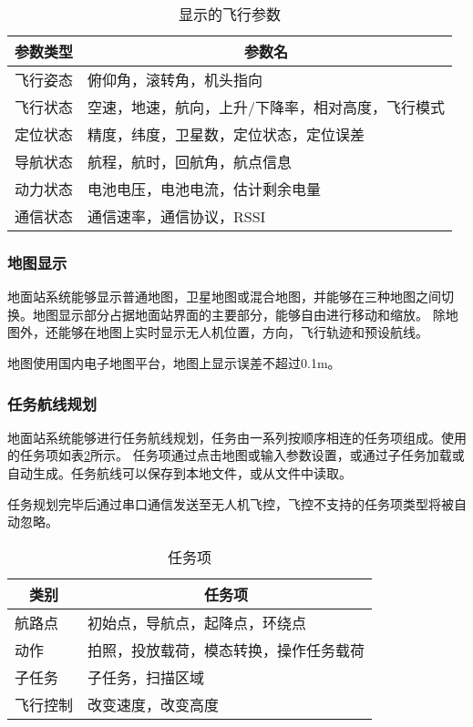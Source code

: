 \begin{table}[ht]
\centering
\caption{显示的飞行参数}
\label{t3dppara}
\begin{tabular}{|l|l|}
\hline
\multicolumn{1}{|c|}{参数类型} & \multicolumn{1}{c|}{参数名}  \\ \hline
飞行姿态 & 俯仰角，滚转角，机头指向              \\ \hline
飞行状态 & 空速，地速，航向，上升/下降率，相对高度，飞行模式 \\ \hline
定位状态 & 精度，纬度，卫星数，定位状态，定位误差       \\ \hline
导航状态 & 航程，航时，回航角，航点信息            \\ \hline
动力状态 & 电池电压，电池电流，估计剩余电量          \\ \hline
通信状态 & 通信速率，通信协议，RSSI            \\ \hline
\end{tabular}
\end{table}

\subsubsection{地图显示}
地面站系统能够显示普通地图，卫星地图或混合地图，并能够在三种地图之间切换。地图显示部分占据地面站界面的主要部分，能够自由进行移动和缩放。
除地图外，还能够在地图上实时显示无人机位置，方向，飞行轨迹和预设航线。

地图使用国内电子地图平台，地图上显示误差不超过0.1m。

\subsubsection{任务航线规划}
地面站系统能够进行任务航线规划，任务由一系列按顺序相连的任务项组成。使用的任务项如表\ref{t3miss}所示。
任务项通过点击地图或输入参数设置，或通过子任务加载或自动生成。任务航线可以保存到本地文件，或从文件中读取。

任务规划完毕后通过串口通信发送至无人机飞控，飞控不支持的任务项类型将被自动忽略。

\begin{table}[ht]
\centering
\caption{任务项}
\label{t3miss}
\begin{tabular}{|l|l|}
\hline
\multicolumn{1}{|c|}{类别} & \multicolumn{1}{c|}{任务项} \\ \hline
航路点                      & 初始点，导航点，起降点，环绕点          \\ \hline
动作                       & 拍照，投放载荷，模态转换，操作任务载荷      \\ \hline
子任务                       & 子任务，扫描区域                 \\ \hline
飞行控制                     & 改变速度，改变高度                \\ \hline
\end{tabular}
\end{table}

